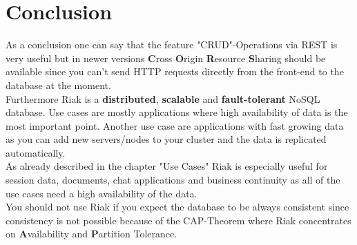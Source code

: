 \section{Conclusion}
As a conclusion one can say that the feature "CRUD"-Operations via REST is very useful but in newer versions \textbf{C}ross \textbf{O}rigin \textbf{R}esource \textbf{S}haring should be available since you can't send HTTP requests directly from the front-end to the database at the moment. 
\\
Furthermore Riak is a \textbf{distributed}, \textbf{scalable} and \textbf{fault-tolerant} NoSQL database. Use cases are mostly applications where high availability of data is the most important point. Another use case are applications with fast growing data as you can add new servers/nodes to your cluster and the data is replicated automatically. \cite{Basho.06.04.2017} 
\\
As already described in the chapter "Use Cases" Riak is especially useful for session data, documents, chat applications and business continuity as all of the use cases need a high availability of the data. \cite{Basho.06.04.2017}
\\
You should not use Riak if you expect the database to be always consistent since consistency is not possible because of the CAP-Theorem where Riak concentrates on \textbf{A}vailability and \textbf{P}artition Tolerance.	